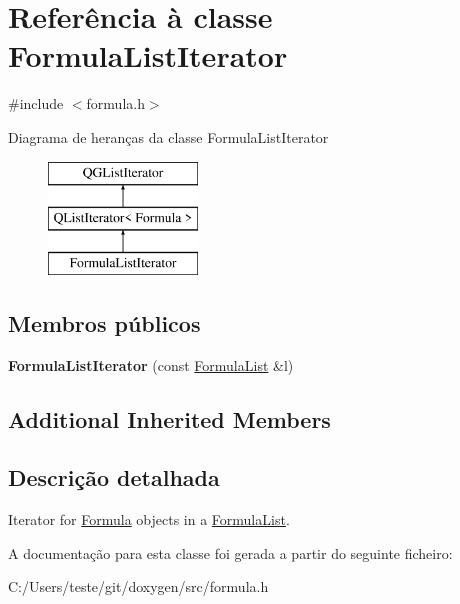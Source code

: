 \hypertarget{class_formula_list_iterator}{\section{Referência à classe Formula\-List\-Iterator}
\label{class_formula_list_iterator}
}


{\ttfamily \#include $<$formula.\-h$>$}

Diagrama de heranças da classe Formula\-List\-Iterator\begin{figure}[H]
\begin{center}
\leavevmode
\includegraphics[height=3.000000cm]{class_formula_list_iterator}
\end{center}
\end{figure}
\subsection*{Membros públicos}
\begin{DoxyCompactItemize}
\item 
\hypertarget{class_formula_list_iterator_ab5bde26d5f7fc4eb7aec0f77188977fb}{{\bfseries Formula\-List\-Iterator} (const \hyperlink{class_formula_list}{Formula\-List} \&l)}\label{class_formula_list_iterator_ab5bde26d5f7fc4eb7aec0f77188977fb}

\end{DoxyCompactItemize}
\subsection*{Additional Inherited Members}


\subsection{Descrição detalhada}
Iterator for \hyperlink{class_formula}{Formula} objects in a \hyperlink{class_formula_list}{Formula\-List}. 

A documentação para esta classe foi gerada a partir do seguinte ficheiro\-:\begin{DoxyCompactItemize}
\item 
C\-:/\-Users/teste/git/doxygen/src/formula.\-h\end{DoxyCompactItemize}
